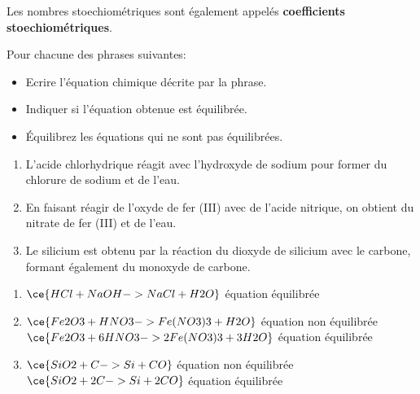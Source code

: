 \documentclass[
  11pt,
  a4paper,
  openany]{book}
\providecommand{\tightlist}{%
  \setlength{\itemsep}{0pt}\setlength{\parskip}{0pt}}
\begin{document}
Les nombres stoechiométriques sont également appelés \textbf{coefficients stoechiométriques}.

\begin{Exercise}

Pour chacune des phrases suivantes:

\begin{itemize}
\tightlist
\item
  Ecrire l'équation chimique décrite par la phrase.
\item
  Indiquer si l'équation obtenue est équilibrée.
\item
  Équilibrez les équations qui ne sont pas équilibrées.
\end{itemize}

\begin{enumerate}
\def\labelenumi{\arabic{enumi}.}
\tightlist
\item
  L'acide chlorhydrique réagit avec l'hydroxyde de sodium pour former du chlorure de sodium et de l'eau.
\item
  En faisant réagir de l'oxyde de fer (III) avec de l'acide nitrique, on obtient du nitrate de fer (III) et de l'eau.
\item
  Le silicium est obtenu par la réaction du dioxyde de silicium avec le carbone, formant également du monoxyde de carbone.
\end{enumerate}

\end{Exercise}

\begin{Answer}

\begin{enumerate}
\def\labelenumi{\arabic{enumi}.}
\item
  \(\ce{HCl + NaOH -> NaCl + H2O}\) équation équilibrée
\item
  \(\ce{Fe2O3 + HNO3 -> Fe(NO3)3 + H2O}\) équation non équilibrée\\
  \(\ce{Fe2O3 + 6HNO3 -> 2Fe(NO3)3 + 3H2O}\) équation équilibrée
\item
  \(\ce{SiO2 + C -> Si + CO}\) équation non équilibrée\\
  \(\ce{SiO2 + 2C -> Si + 2CO}\) équation équilibrée
\end{enumerate}

\end{Answer}
\end{document}
